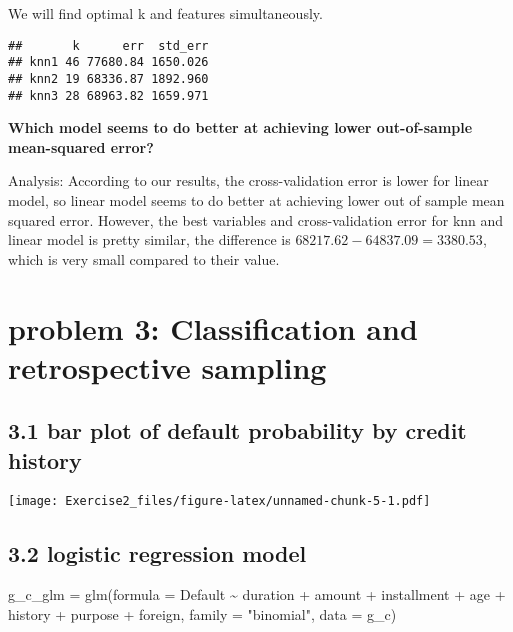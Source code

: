 \documentclass[
]{article}
\newenvironment{Shaded}{\begin{snugshade}}{\end{snugshade}}
\newcommand{\AttributeTok}[1]{\textcolor[rgb]{0.77,0.63,0.00}{#1}}
\newcommand{\FunctionTok}[1]{\textcolor[rgb]{0.00,0.00,0.00}{#1}}
\newcommand{\NormalTok}[1]{#1}
\newcommand{\OtherTok}[1]{\textcolor[rgb]{0.56,0.35,0.01}{#1}}
\newcommand{\SpecialCharTok}[1]{\textcolor[rgb]{0.00,0.00,0.00}{#1}}
\newcommand{\StringTok}[1]{\textcolor[rgb]{0.31,0.60,0.02}{#1}}
\begin{document}
We will find optimal k and features simultaneously.

\begin{verbatim}
##       k      err  std_err
## knn1 46 77680.84 1650.026
## knn2 19 68336.87 1892.960
## knn3 28 68963.82 1659.971
\end{verbatim}

\textbf{Which model seems to do better at achieving lower out-of-sample
mean-squared error?}

Analysis: According to our results, the cross-validation error is lower
for linear model, so linear model seems to do better at achieving lower
out of sample mean squared error. However, the best variables and
cross-validation error for knn and linear model is pretty similar, the
difference is \(68217.62-64837.09=3380.53\), which is very small
compared to their value.

\hypertarget{problem-3-classification-and-retrospective-sampling}{%
\section{problem 3: Classification and retrospective
sampling}\label{problem-3-classification-and-retrospective-sampling}}

\hypertarget{bar-plot-of-default-probability-by-credit-history}{%
\subsection{3.1 bar plot of default probability by credit
history}\label{bar-plot-of-default-probability-by-credit-history}}

\texttt{[image: Exercise2\_files/figure-latex/unnamed-chunk-5-1.pdf]}

\hypertarget{logistic-regression-model}{%
\subsection{3.2 logistic regression
model}\label{logistic-regression-model}}

\begin{Shaded}
\begin{Highlighting}[]
\NormalTok{g\_c\_glm }\OtherTok{=} \FunctionTok{glm}\NormalTok{(}\AttributeTok{formula =}\NormalTok{ Default }\SpecialCharTok{\textasciitilde{}}\NormalTok{ duration }\SpecialCharTok{+}\NormalTok{ amount }\SpecialCharTok{+}\NormalTok{ installment }\SpecialCharTok{+}\NormalTok{ age }\SpecialCharTok{+} 
\NormalTok{      history }\SpecialCharTok{+}\NormalTok{ purpose }\SpecialCharTok{+}\NormalTok{ foreign, }\AttributeTok{family =} \StringTok{"binomial"}\NormalTok{, }\AttributeTok{data =}\NormalTok{ g\_c)}
\end{Highlighting}
\end{Shaded}
\end{document}
